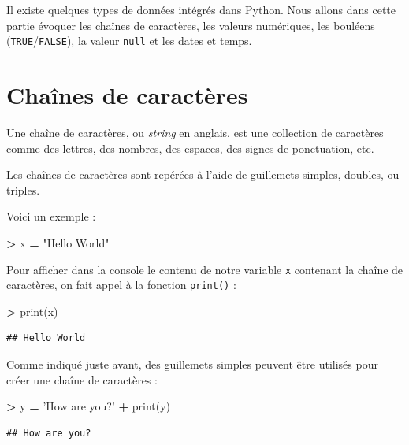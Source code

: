 \documentclass[12pt,]{book}
\newenvironment{Shaded}{\begin{snugshade}}{\end{snugshade}}
\newcommand{\StringTok}[1]{\textcolor[rgb]{0.31,0.60,0.02}{#1}}
\newcommand{\OperatorTok}[1]{\textcolor[rgb]{0.81,0.36,0.00}{\textbf{#1}}}
\newcommand{\BuiltInTok}[1]{#1}
\newcommand{\NormalTok}[1]{#1}
\numberwithin{equation}{section}
\numberwithin{countremarque}{section}
\begin{document}
Il existe quelques types de données intégrés dans Python. Nous allons
dans cette partie évoquer les chaînes de caractères, les valeurs
numériques, les bouléens (\texttt{TRUE}/\texttt{FALSE}), la valeur
\texttt{null} et les dates et temps.

\section{Chaînes de caractères}\label{chaines-de-caracteres}

Une chaîne de caractères, ou \emph{string} en anglais, est une
collection de caractères comme des lettres, des nombres, des espaces,
des signes de ponctuation, etc.

Les chaînes de caractères sont repérées à l'aide de guillemets simples,
doubles, ou triples.

Voici un exemple :

\begin{Shaded}
\begin{Highlighting}[]
\OperatorTok{>}\NormalTok{ x }\OperatorTok{=} \StringTok{"Hello World"}
\end{Highlighting}
\end{Shaded}

Pour afficher dans la console le contenu de notre variable \texttt{x}
contenant la chaîne de caractères, on fait appel à la fonction
\texttt{print()} :

\begin{Shaded}
\begin{Highlighting}[]
\OperatorTok{>} \BuiltInTok{print}\NormalTok{(x)}
\end{Highlighting}
\end{Shaded}

\begin{lstlisting}
## Hello World
\end{lstlisting}

Comme indiqué juste avant, des guillemets simples peuvent être utilisés
pour créer une chaîne de caractères :

\begin{Shaded}
\begin{Highlighting}[]
\OperatorTok{>}\NormalTok{ y }\OperatorTok{=} \StringTok{'How are you?'}
\OperatorTok{+} \BuiltInTok{print}\NormalTok{(y)}
\end{Highlighting}
\end{Shaded}

\begin{lstlisting}
## How are you?
\end{lstlisting}
\end{document}
